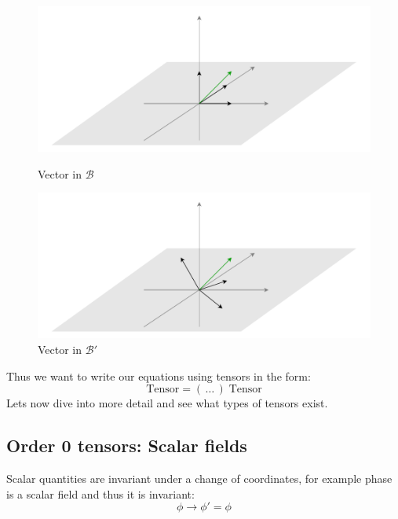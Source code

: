 \begin{figure}[H]
    \begin{minipage}{0.5\textwidth}
     \centering
     \includegraphics[width=1\linewidth]{res/svg/vector.drawio}
     \caption{Vector in $\mathcal{B}$}
   \end{minipage}\hfill
   \begin{minipage}{0.5\textwidth}
     \centering
     \includegraphics[width=1\linewidth]{res/svg/vettore_new.drawio}
     \caption{Vector in $\mathcal{B}'$}
   \end{minipage}
\end{figure}
Thus we want to write our equations using tensors in the form:
\begin{equation}
  \text{Tensor} = ( \,\dots\, )\;\text{Tensor}
\end{equation}
Lets now dive into more detail and see what types of tensors exist.
\subsection{Order 0 tensors: Scalar fields}
Scalar quantities are invariant under a change of coordinates, for example phase is a scalar field and thus it is invariant:
\begin{equation}
  \phi \longrightarrow \phi' = \phi
\end{equation}
